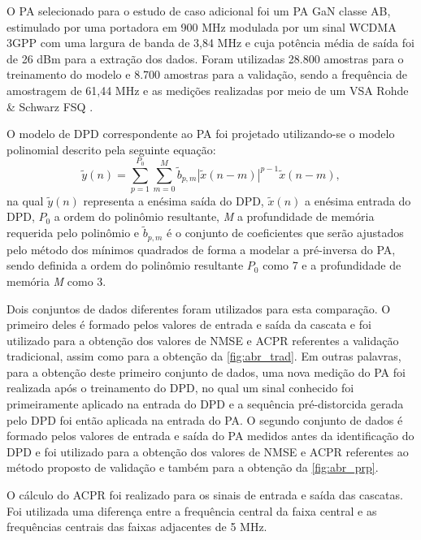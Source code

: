 O PA selecionado para o estudo de caso adicional foi um PA GaN classe AB, estimulado por uma portadora em 900 MHz modulada por um sinal WCDMA 3GPP com uma largura de banda de 3,84 MHz e cuja potência média de saída foi de 26 dBm para a extração dos dados. Foram utilizadas 28.800 amostras para o treinamento do modelo e 8.700 amostras para a validação, sendo a frequência de amostragem de 61,44 MHz e as medições realizadas por meio de um VSA Rohde \& Schwarz FSQ \cite{lima2009rfpa}.

O modelo de DPD correspondente ao PA foi projetado utilizando-se o modelo polinomial descrito pela seguinte equação:
\begin{equation}
\tilde{y}(n) = \sum\limits_{p=1}^{P_0} \sum\limits_{m=0}^{M}\tilde{b}_{p,m}|\tilde{x}(n-m)|^{p-1}\tilde{x}(n-m),
\label{dpdcomp}
\end{equation}
na qual $\tilde{y}(n)$ representa a enésima saída do DPD, $\tilde{x}(n)$ a enésima entrada do DPD, $P_{0}$ a ordem do polinômio resultante, \textit{M} a profundidade de memória requerida pelo polinômio e $\tilde{b}_{p,m}$ é o conjunto de coeficientes que serão ajustados pelo método dos mínimos quadrados de forma a modelar a pré-inversa do PA, sendo definida a ordem do polinômio resultante $P_{0}$ como 7 e a profundidade de memória \textit{M} como 3.

Dois conjuntos de dados diferentes foram utilizados para esta comparação. O primeiro deles é formado pelos valores de entrada e saída da cascata e foi utilizado para a obtenção dos valores de NMSE e ACPR referentes a validação tradicional, assim como para a obtenção da \autoref{fig:abr_trad}. Em outras palavras, para a obtenção deste primeiro conjunto de dados, uma nova medição do PA foi realizada após o treinamento do DPD, no qual um sinal conhecido foi primeiramente aplicado na entrada do DPD e a sequência pré-distorcida gerada pelo DPD foi então aplicada na entrada do PA. O segundo conjunto de dados é formado pelos valores de entrada e saída do PA medidos antes da identificação do DPD e foi utilizado para a obtenção dos valores de NMSE e ACPR referentes ao método proposto de validação e também para a obtenção da \autoref{fig:abr_prp}.

O cálculo do ACPR foi realizado para os sinais de entrada e saída das cascatas. Foi utilizada uma diferença entre a frequência central da faixa central e as frequências centrais das faixas adjacentes de 5 MHz.

